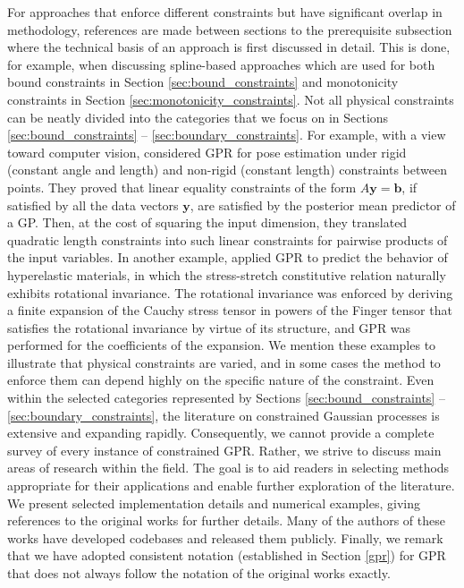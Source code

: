 For approaches that enforce different constraints but have significant overlap in methodology, references are made between sections to the prerequisite subsection where the technical basis of an approach is first discussed in detail. This is done, for example, when discussing spline-based approaches which are used for both bound constraints in Section \ref{sec:bound_constraints} and monotonicity constraints in Section \ref{sec:monotonicity_constraints}.
Not all physical constraints can be neatly divided into the categories that we focus on in Sections \ref{sec:bound_constraints} -- \ref{sec:boundary_constraints}. For example, with a view toward computer vision,  considered GPR for pose estimation under rigid (constant angle and length) and non-rigid (constant length) constraints between points. They proved that linear equality constraints of the form $A\mathbf{y} = \mathbf{b}$, if satisfied by all the data vectors $\mathbf{y}$, are satisfied by the posterior mean predictor of a GP. Then, at the cost of squaring the input dimension, they translated quadratic length constraints into such linear constraints for pairwise products of the input variables. 
In another example,  applied GPR to predict the behavior of hyperelastic materials, in which the stress-stretch constitutive relation naturally exhibits rotational invariance. The rotational invariance was enforced by deriving a finite expansion of the Cauchy stress tensor in powers of the Finger tensor that satisfies the rotational invariance by virtue of its structure, and GPR was performed for the coefficients of the expansion.  
We mention these examples to illustrate that physical constraints are varied, and in some cases the method to enforce them can depend highly on the specific nature of the constraint.
Even within the selected categories represented by Sections \ref{sec:bound_constraints} -- \ref{sec:boundary_constraints}, the literature on constrained Gaussian processes is extensive and expanding rapidly. Consequently, we cannot provide a complete survey of every instance of constrained GPR.  
Rather, we strive to discuss main areas of research within the field. The goal is to aid readers in selecting methods appropriate for their applications and enable further exploration of the literature. We present selected implementation details and numerical examples, giving references to the original works for further details. Many of the authors of these works have developed codebases and released them publicly. Finally, we remark that we have adopted consistent notation (established in Section \ref{gpr}) for GPR that does not always follow the notation of the original works exactly.

